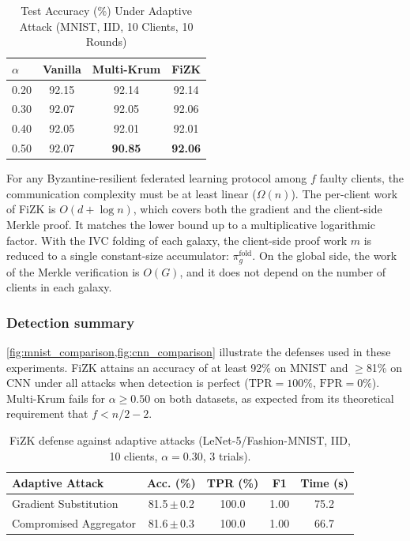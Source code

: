 \documentclass[10pt,twocolumn,letterpaper]{article}
\begin{document}
\begin{table}[t]
  \centering
  \small
  \caption{Test Accuracy (\%) Under Adaptive Attack (MNIST, IID, 10 Clients, 10 Rounds)}
  \label{tab:accuracy}
  \begin{tabular}{@{}lccc@{}}
    \toprule
    \boldmath$\alpha$ & \textbf{Vanilla} & \textbf{Multi-Krum} & \textbf{FiZK} \\
    \midrule
    0.20 & 92.15 & 92.14          & 92.14 \\
    0.30 & 92.07 & 92.05          & 92.06 \\
    0.40 & 92.05 & 92.01          & 92.01 \\
    0.50 & 92.07 & \textbf{90.85} & \textbf{92.06} \\
    \bottomrule
  \end{tabular}
\end{table}

For any Byzantine-resilient federated learning protocol among $f$ faulty clients, the communication complexity must be at least linear ($\Omega(n)$). The per-client work of FiZK is $O(d + \log n)$, which covers both the gradient and the client-side Merkle proof. It matches the lower bound up to a multiplicative logarithmic factor. With the IVC folding of each galaxy, the client-side proof work $m$ is reduced to a single constant-size accumulator: $\pi_g^{\text{fold}}$. On the global side, the work of the Merkle verification is $O(G)$, and it does not depend on the number of clients in each galaxy.

\subsubsection{Detection summary}

\cref{fig:mnist_comparison,fig:cnn_comparison} illustrate the defenses used in these experiments. FiZK attains an accuracy of at least 92\% on MNIST and $\geq$81\% on CNN under all attacks when detection is perfect ($\mathrm{TPR} = 100\%$, $\mathrm{FPR} = 0\%$). Multi-Krum fails for $\alpha \geq 0.50$ on both datasets, as expected from its theoretical requirement that $f < n/2 - 2$.

\begin{table}[t]
  \centering
  \small
  \caption{FiZK defense against adaptive attacks (LeNet-5/Fashion-MNIST,
    IID, 10 clients, $\alpha=0.30$, 3 trials).}
  \label{tab:cnn_adaptive}
  \setlength{\tabcolsep}{5pt}
  \begin{tabular}{@{}lcccc@{}}
    \toprule
    \textbf{Adaptive Attack} & \textbf{Acc. (\%)} & \textbf{TPR (\%)} & \textbf{F1} & \textbf{Time (s)} \\
    \midrule
    Gradient Substitution & 81.5\,$\pm$\,0.2 & 100.0 & 1.00 & 75.2 \\
    Compromised Aggregator & 81.6\,$\pm$\,0.3 & 100.0 & 1.00 & 66.7 \\
    \bottomrule
  \end{tabular}
\end{table}
\end{document}
